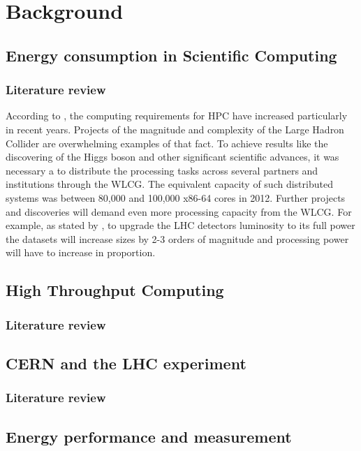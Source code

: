 \chapter{Background}

\section{Energy consumption in Scientific Computing}
\subsection{Literature review}

According to  \cite{ACAT13ARM}, the computing requirements for HPC have 
increased particularly in recent
years. Projects of the magnitude and complexity of the Large Hadron Collider are
overwhelming examples of that fact. To achieve results like the discovering of
the Higgs boson and other significant scientific advances, it was necessary a 
 to distribute the processing tasks across several partners and institutions
through the WLCG. The equivalent capacity of such distributed systems was between 
80,000 and 100,000 x86-64 cores in 2012.
Further projects and discoveries will demand even more processing capacity from
the WLCG. For example, as stated by \cite{ACAT13ARM}, to upgrade the LHC 
detectors luminosity to its full power the datasets will increase sizes by 2-3
orders of magnitude and processing power will have to increase in proportion.


\section{High Throughput Computing}
\subsection{Literature review}



\section{CERN and the LHC experiment}
\subsection{Literature review}



\section{Energy performance and measurement}
